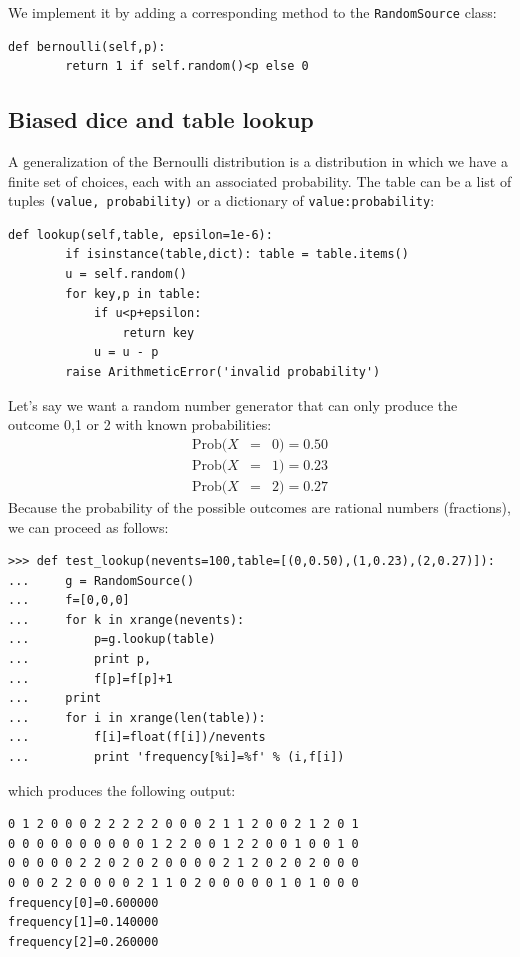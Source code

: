 \documentclass[justified,sixbynine]{tufte-book}
\def\ft{\small\tt}
\theoremstyle{plain}%
\theoremstyle{definition}
\theoremstyle{remark}
\begin{document}
\begin{fullwidth}
We implement it by adding a corresponding method to the {\ft RandomSource} class:

\begin{lstlisting}[caption={in file: {\ft nlib.py}}]
    def bernoulli(self,p):
        return 1 if self.random()<p else 0
\end{lstlisting}

\goodbreak\subsection{Biased dice and table lookup}

A generalization of the Bernoulli distribution is a distribution in which we have a finite set of choices, each with an associated probability. The table can be a list of tuples {\ft (value, probability)} or a dictionary of {\ft value:probability}:

\begin{lstlisting}[caption={in file: {\ft nlib.py}}]
    def lookup(self,table, epsilon=1e-6):
        if isinstance(table,dict): table = table.items()
        u = self.random()
        for key,p in table:
            if u<p+epsilon:
                return key
            u = u - p
        raise ArithmeticError('invalid probability')
\end{lstlisting}

Let's say we want a random number generator that can only produce the
outcome 0,1 or 2 with known probabilities:
\begin{eqnarray}
\textrm{Prob}(X &=&0)=0.50 \\
\textrm{Prob}(X &=&1)=0.23 \\
\textrm{Prob}(X &=&2)=0.27
\end{eqnarray}
Because the probability of the possible outcomes are rational numbers
(fractions), we can proceed as follows:
\begin{lstlisting}
>>> def test_lookup(nevents=100,table=[(0,0.50),(1,0.23),(2,0.27)]):
...     g = RandomSource()
...     f=[0,0,0]
...     for k in xrange(nevents):
...         p=g.lookup(table)
...         print p,
...         f[p]=f[p]+1
...     print
...     for i in xrange(len(table)):
...         f[i]=float(f[i])/nevents
...         print 'frequency[%i]=%f' % (i,f[i])
\end{lstlisting}

which produces the following output:

\begin{lstlisting}
0 1 2 0 0 0 2 2 2 2 2 0 0 0 2 1 1 2 0 0 2 1 2 0 1
0 0 0 0 0 0 0 0 0 0 1 2 2 0 0 1 2 2 0 0 1 0 0 1 0
0 0 0 0 0 2 2 0 2 0 2 0 0 0 0 2 1 2 0 2 0 2 0 0 0
0 0 0 2 2 0 0 0 0 2 1 1 0 2 0 0 0 0 0 1 0 1 0 0 0
frequency[0]=0.600000
frequency[1]=0.140000
frequency[2]=0.260000
\end{lstlisting}


\end{fullwidth}
\end{document}
